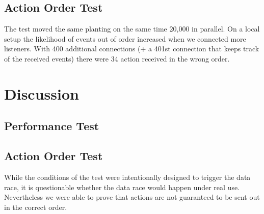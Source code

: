 \documentclass[final,draft,oneside]{vutinfth}
\begin{document}
\section{Action Order Test}

The test moved the same planting on the same time 20,000 in parallel.
On a local setup the likelihood of events out of order increased when we connected more listeners.
With 400 additional connections (+ a 401st connection that keeps track of the received events) there were 34 action received in the wrong order.

\chapter{Discussion}

\section{Performance Test}

\section{Action Order Test}

While the conditions of the test were intentionally designed to trigger the data race, it is questionable whether the data race would happen under real use.
Nevertheless we were able to prove that actions are not guaranteed to be sent out in the correct order.

\printglossary[type=\acronymtype,title=Acronyms]

\backmatter



\end{document}
